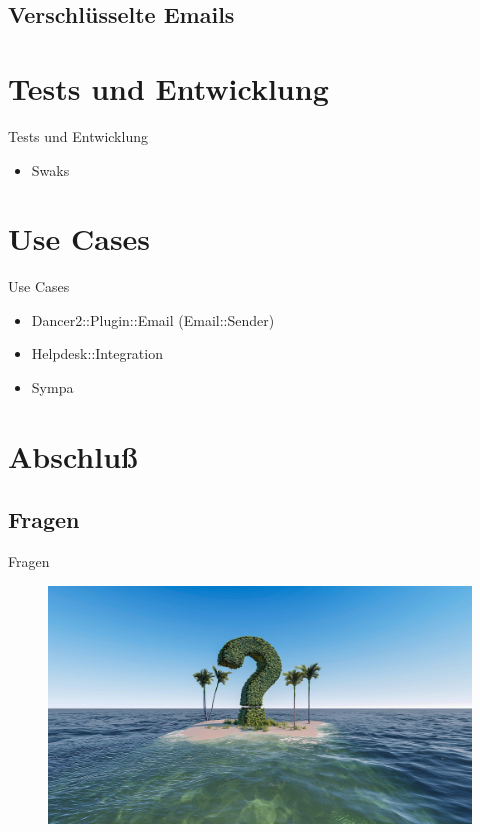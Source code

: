 \subsection{Verschlüsselte Emails}

\section{Tests und Entwicklung}

\begin{frame}{Tests und Entwicklung}
  \begin{itemize}
  \item Swaks
  \end{itemize}
\end{frame}

\section{Use Cases}

\begin{frame}{Use Cases}
  \begin{itemize}
  \item Dancer2::Plugin::Email (Email::Sender)
  \item Helpdesk::Integration
  \item Sympa
  \end{itemize}
\end{frame}

\section{Abschluß}

\subsection{Fragen}

\begin{frame}{Fragen}
  \begin{figure}[!ht]
     \centering
     \includegraphics[width=0.9\linewidth]{img/question-mark-3255140_1920.jpg}
  \end{figure}
\end{frame}

